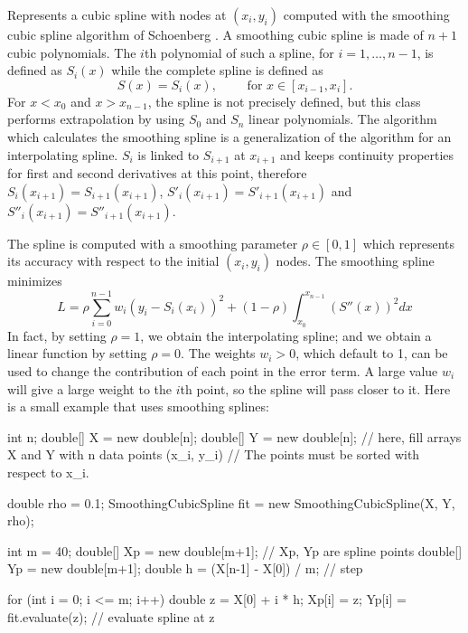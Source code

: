 

Represents a cubic spline with nodes at $(x_i, y_i)$ computed with
the smoothing cubic spline algorithm of Schoenberg \cite{mDEB78a,mPOL93a}.
 A smoothing cubic spline
is made of $n+1$ cubic polynomials. The $i$th polynomial of such a spline,
for $i=1,\ldots,n-1$, is defined as $S_i(x)$ while the complete spline is
defined as
 \[
S(x) = S_i(x), \qquad\mbox{ for }x\in[x_{i-1}, x_{i}].
\]
For $x<x_0$ and
$x>x_{n-1}$, the spline is not precisely defined, but this class performs
extrapolation by using $S_0$ and $S_{n}$ linear polynomials.
The algorithm which calculates the smoothing spline is a
generalization of the algorithm for an interpolating spline.
$S_i$ is linked to $S_{i+1}$ at $x_{i+1}$ and keeps continuity properties for
first and second derivatives at this point, therefore
 $S_i(x_{i+1})=S_{i+1}(x_{i+1})$,
$S'_i(x_{i+1})=S'_{i+1}(x_{i+1})$ and $S''_i(x_{i+1})=S''_{i+1}(x_{i+1})$.

The spline is computed with a smoothing parameter $\rho\in[0, 1]$ which represents its accuracy with respect to the initial $(x_i, y_i)$ nodes. The smoothing spline minimizes
\[
L = \rho\sum_{i=0}^{n-1}{w_i}\left({y_i - S_i(x_i)}\right)^2 +
(1-\rho)\int_{x_0}^{x_{n-1}}\left(S''(x)\right)^2dx
\]
In fact, by setting $\rho = 1$, we obtain the interpolating spline; and
we obtain a linear function by setting $\rho = 0$.
The weights $w_i>0$, which default to 1, can be used to change the contribution
of each point in the error term. A large value $w_i$ will give a large weight
 to the $i$th point, so the spline will pass closer to it.
Here is a small example that uses smoothing splines:

\begin{vcode}

   int n;
   double[] X = new double[n];
   double[] Y = new double[n];
   // here, fill arrays X and Y with n data points (x_i, y_i)
   // The points must be sorted with respect to x_i.

   double rho = 0.1;
   SmoothingCubicSpline fit = new SmoothingCubicSpline(X, Y, rho);

   int m = 40;
   double[] Xp = new double[m+1];       // Xp, Yp are spline points
   double[] Yp = new double[m+1];
   double h = (X[n-1] - X[0]) / m;      // step

   for (int i = 0; i <= m; i++) {
      double z = X[0] + i * h;
      Xp[i] = z;
      Yp[i] = fit.evaluate(z);          // evaluate spline at z
   }

\end{vcode}

